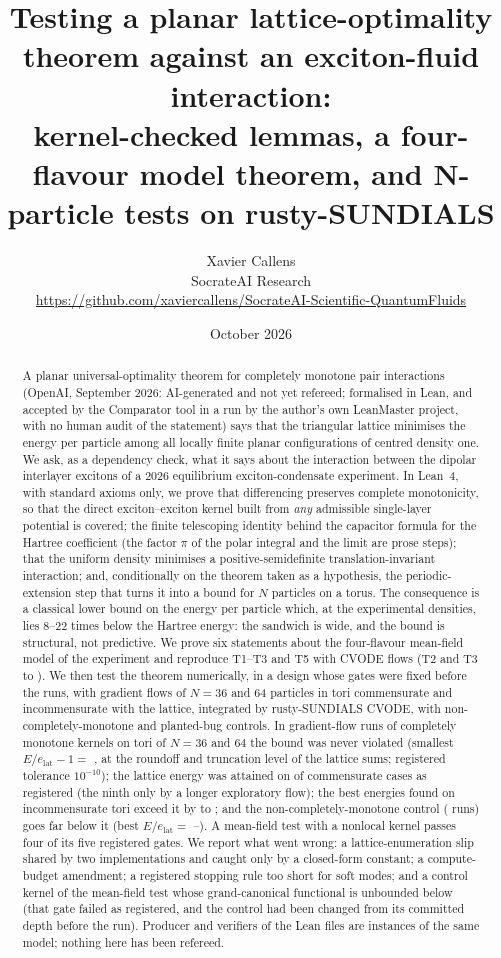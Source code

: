 \documentclass[11pt,a4paper]{article}
\title{\textbf{Testing a planar lattice-optimality theorem against an exciton-fluid interaction:}\\
kernel-checked lemmas, a four-flavour model theorem, and N-particle tests on rusty-SUNDIALS}
\author{Xavier Callens\\ \small SocrateAI Research\\
\small \url{https://github.com/xaviercallens/SocrateAI-Scientific-QuantumFluids}}
\date{October 2026}
\renewcommand{\NPARTABSTRACT}{In \NRunsCM{} gradient-flow runs of completely monotone kernels on tori of $N=36$ and $64$ the bound was never violated
(smallest $E/e_{\mathrm{lat}}-1=$ \NMinRatio{}, at the roundoff and truncation level of the lattice sums; registered tolerance $10^{-10}$);
the lattice energy was attained on \NCommAttained{} of \NCommTotal{} commensurate cases as registered (the ninth only by a longer
exploratory flow); the best energies found on incommensurate tori exceed it by \NFrusMin{} to \NFrusMax{}; and the
non-completely-monotone control (\NRunsN{} runs) goes far below it (best $E/e_{\mathrm{lat}}=$ \NNoneBest{}--\NNoneWorst{}). A mean-field test
with a nonlocal kernel passes four of its five registered gates.}
\begin{document}
\maketitle

\begin{abstract}\noindent
A planar universal-optimality theorem for completely monotone pair interactions (OpenAI, September 2026: AI-generated and not yet
refereed; formalised in Lean, and accepted by the Comparator tool in a run by the author's own LeanMaster project, with no human audit
of the statement) says that the triangular lattice minimises the energy per particle among all locally finite planar configurations of
centred density one. We ask, as a dependency check, what it says about the interaction between the dipolar interlayer excitons of a
2026 equilibrium exciton-condensate experiment. In Lean~4, with standard axioms only, we prove that differencing preserves complete
monotonicity, so that the direct exciton--exciton kernel built from \emph{any} admissible single-layer potential is covered; the finite
telescoping identity behind the capacitor formula for the Hartree coefficient (the factor $\pi$ of the polar integral and the limit are
prose steps); that the uniform density minimises a positive-semidefinite translation-invariant interaction; and, conditionally on the
theorem taken as a hypothesis, the periodic-extension step that turns it into a bound for $N$ particles on a torus. The consequence is a
classical lower bound on the energy per particle which, at the experimental densities, lies $8$--$22$ times below the Hartree energy: the
sandwich is wide, and the bound is structural, not predictive. We prove six statements about the four-flavour mean-field model of the
experiment and reproduce T1--T3 and T5 with CVODE flows (T2 and T3 to \FFworstRel{}). We then test the theorem numerically, in a design
whose gates were fixed before the runs, with gradient flows of $N=36$ and $64$ particles in tori commensurate and incommensurate with the
lattice, integrated by rusty-SUNDIALS CVODE, with non-completely-monotone and planted-bug controls. \NPARTABSTRACT{} We report what went
wrong: a lattice-enumeration slip shared by two implementations and caught only by a closed-form constant; a compute-budget amendment; a
registered stopping rule too short for soft modes; and a control kernel of the mean-field test whose grand-canonical functional is
unbounded below (that gate failed as registered, and the control had been changed from its committed depth before the run). Producer and
verifiers of the Lean files are instances of the same model; nothing here has been refereed.
\end{abstract}
\end{document}
